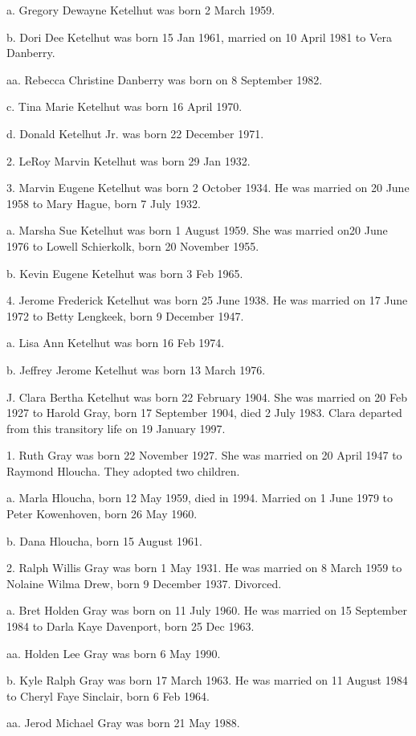 \documentclass[a4paper]{article}
\begin{document}
a. Gregory Dewayne Ketelhut was born 2 March 1959.

b. Dori Dee Ketelhut was born 15 Jan 1961, married on 10 April 1981 to Vera Danberry.

aa. Rebecca Christine Danberry was born on 8 September 1982.

c. Tina Marie Ketelhut was born 16 April 1970.

d. Donald Ketelhut Jr. was born 22 December 1971.

2. LeRoy Marvin Ketelhut was born 29 Jan 1932.

3. Marvin Eugene Ketelhut was born 2 October 1934.  He was married on 20 June 1958 to Mary Hague, born 7 July 1932.

a. Marsha Sue Ketelhut was born 1 August 1959.  She was married on20 June 1976 to Lowell Schierkolk, born 20 November 1955.

b. Kevin Eugene Ketelhut was born 3 Feb 1965.

4. Jerome Frederick Ketelhut was born 25 June 1938.  He was married on 17 June 1972 to Betty Lengkeek, born 9 December 1947.

a. Lisa Ann Ketelhut was born 16 Feb 1974.

b. Jeffrey Jerome Ketelhut was born 13 March 1976.

J. Clara Bertha Ketelhut was born 22 February 1904.  She was married on 20 Feb 1927 to Harold Gray, born 17 September 1904, died 2 July 1983.  Clara departed from this transitory life on 19 January 1997.  

1. Ruth Gray was born 22 November 1927.  She was married on 20 April 1947 to Raymond Hloucha.  They adopted two children.

a. Marla Hloucha, born 12 May 1959, died in 1994.  Married  on 1 June 1979 to Peter Kowenhoven, born 26 May 1960.

b. Dana Hloucha, born 15 August 1961.

2. Ralph Willis Gray was born 1 May 1931.  He was married on 8 March 1959 to Nolaine Wilma Drew, born 9 December 1937.  Divorced.

a. Bret Holden Gray was born on 11 July 1960.  He was married on 15 September  1984 to Darla Kaye Davenport, born 25 Dec 1963.

aa. Holden Lee Gray was born 6 May 1990.

b. Kyle Ralph Gray was born 17 March 1963.  He was married on 11 August 1984 to Cheryl Faye Sinclair, born 6 Feb 1964.

aa. Jerod Michael Gray was born 21 May 1988.
\end{document}
